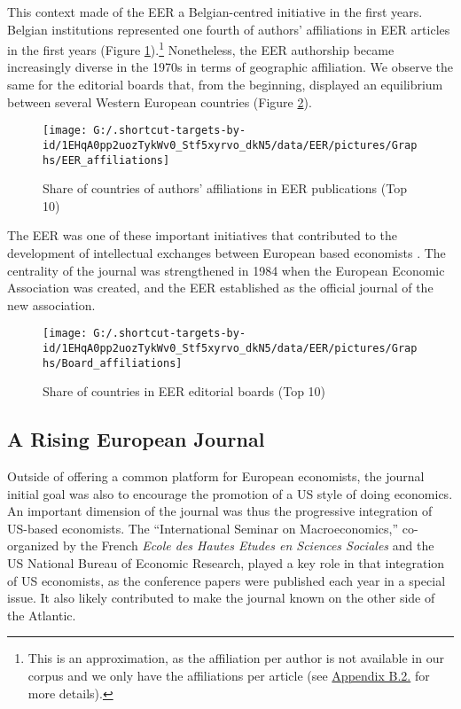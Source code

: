 \documentclass[]{elsarticle} %
\begin{document}
This context made of the EER a Belgian-centred initiative in the first
years. Belgian institutions represented one fourth of authors'
affiliations in EER articles in the first years (Figure
\ref{fig:plot-authors}).\footnote{This is an approximation, as the
  affiliation per author is not available in our corpus and we only have
  the affiliations per article (see
  \protect\hyperlink{author-affiliation}{Appendix B.2.} for more
  details).} Nonetheless, the EER authorship became increasingly diverse
in the 1970s in terms of geographic affiliation. We observe the same for
the editorial boards that, from the beginning, displayed an equilibrium
between several Western European countries (Figure
\ref{fig:plot-boards}).

\begin{figure}[h]

{\centering \texttt{[image: G:/.shortcut-targets-by-id/1EHqA0pp2uozTykWv0\_Stf5xyrvo\_dkN5/data/EER/pictures/Graphs/EER\_affiliations]} 

}

\caption{Share of countries of authors' affiliations in EER publications (Top 10)}\label{fig:plot-authors}
\end{figure}

The EER was one of these important initiatives that contributed to the
development of intellectual exchanges between European based economists
\citep{goutsmedt2021}. The centrality of the journal was strengthened in
1984 when the European Economic Association was created, and the EER
established as the official journal of the new association.

\begin{figure}[h]

{\centering \texttt{[image: G:/.shortcut-targets-by-id/1EHqA0pp2uozTykWv0\_Stf5xyrvo\_dkN5/data/EER/pictures/Graphs/Board\_affiliations]} 

}

\caption{Share of countries in EER editorial boards (Top 10)}\label{fig:plot-boards}
\end{figure}

\hypertarget{rising-journal}{%
\subsection{A Rising European Journal}\label{rising-journal}}

Outside of offering a common platform for European economists, the
journal initial goal was also to encourage the promotion of a US style
of doing economics. An important dimension of the journal was thus the
progressive integration of US-based economists. The ``International
Seminar on Macroeconomics,'' co-organized by the French \emph{Ecole des
Hautes Etudes en Sciences Sociales} and the US National Bureau of
Economic Research, played a key role in that integration of US
economists, as the conference papers were published each year in a
special issue. It also likely contributed to make the journal known on
the other side of the Atlantic.
\end{document}
